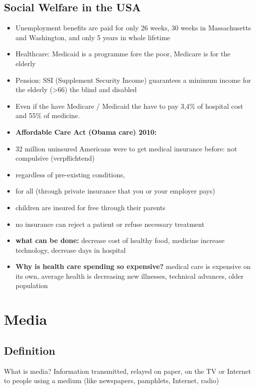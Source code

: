 \documentclass[a5paper,12pt,twoside,titlepage]{scrartcl}
\begin{document}
\subsection{Social Welfare in the USA}
\begin{itemize}
	\item Unemployment benefits are paid for only 26 weeks, 30 weeks in Massachusetts and Washington, and only 5 years in whole lifetime
	\item Healthcare: Medicaid is a programme fore the poor, Medicare is for the elderly
	\item Pension: SSI (Supplement Security Income) guarantees a minimum income for the elderly (>66) the blind and disabled
	\item Even if the have Medicare / Medicaid the have to pay 3,4\% of hospital cost and 55\% of medicine.
	\item\textbf{ Affordable Care Act (Obama care) 2010:}
	\item 32 million uninsured Americans were to get medical insurance \textrightarrow before: not compulsive (verpflichtend)
	\item \textrightarrow regardless of pre-existing conditions, 
	\item \textrightarrow for all (through private insurance that you or your employer pays)
	\item \textrightarrow children are insured for free through their parents
	\item \textrightarrow no insurance can reject a patient or refuse necessary treatment 
	\item \textbf{what can be done:}
	\subitem decrease cost of healthy food, medicine
	\subitem increase technology, decrease days in hospital
	\item \textbf{Why is health care spending so expensive?}
	\subitem medical care is expensive on its own, 
	\subitem average health is decreasing
	\subitem new illnesses, technical advances, older population
\end{itemize}


\section{Media}
\subsection{Definition}
	What is media? Information transmitted, relayed on paper, on the TV or Internet to people using a medium (like newspapers, pamphlets, Internet, radio)
\end{document}
